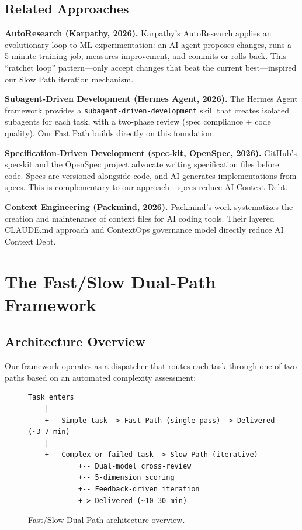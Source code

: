 \documentclass[11pt,a4paper]{article}
\begin{document}
\subsection{Related Approaches}

\textbf{AutoResearch (Karpathy, 2026).} Karpathy's AutoResearch \cite{karpathy2026} applies an evolutionary loop to ML experimentation: an AI agent proposes changes, runs a 5-minute training job, measures improvement, and commits or rolls back. This ``ratchet loop'' pattern---only accept changes that beat the current best---inspired our Slow Path iteration mechanism.

\textbf{Subagent-Driven Development (Hermes Agent, 2026).} The Hermes Agent framework \cite{hermes2026} provides a \texttt{subagent-driven-development} skill that creates isolated subagents for each task, with a two-phase review (spec compliance + code quality). Our Fast Path builds directly on this foundation.

\textbf{Specification-Driven Development (spec-kit, OpenSpec, 2026).} GitHub's spec-kit and the OpenSpec project advocate writing specification files before code. Specs are versioned alongside code, and AI generates implementations from specs. This is complementary to our approach---specs reduce AI Context Debt.

\textbf{Context Engineering (Packmind, 2026).} Packmind's work \cite{packmind2026} systematizes the creation and maintenance of context files for AI coding tools. Their layered CLAUDE.md approach and ContextOps governance model directly reduce AI Context Debt.

\section{The Fast/Slow Dual-Path Framework}

\subsection{Architecture Overview}

Our framework operates as a dispatcher that routes each task through one of two paths based on an automated complexity assessment:

\begin{figure}[h]
\centering
\begin{lstlisting}[frame=none, numbers=none]
Task enters
    |
    +-- Simple task -> Fast Path (single-pass) -> Delivered (~3-7 min)
    |
    +-- Complex or failed task -> Slow Path (iterative)
            +-- Dual-model cross-review
            +-- 5-dimension scoring
            +-- Feedback-driven iteration
            +-> Delivered (~10-30 min)
\end{lstlisting}
\caption{Fast/Slow Dual-Path architecture overview.}
\end{figure}
\end{document}

